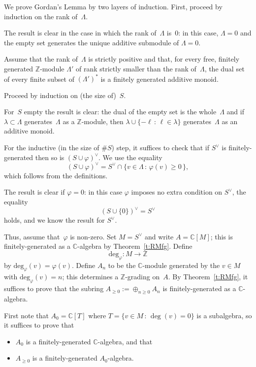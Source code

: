 \documentclass[english]{amsart}
\newcommand{\C}{\mathbb{C}}
\newcommand{\Z}{\mathbb{Z}}
\newcommand{\Az}{A_{\geq0}}
\newcommand{\ev}{\textrm{deg}_\varphi}
\begin{document}
We prove Gordan's Lemma by two layers of induction.  First, proceed by induction on the rank of~$\Lambda$.

The result is clear in the case in which the rank of~$\Lambda$ is~$0$: in this case, $\Lambda = 0$ and the empty set generates the unique additive submodule of $\Lambda = 0$.

Assume that the rank of~$\Lambda$ is strictly positive and that, for every free, finitely generated $\Z$-module $\Lambda'$ of rank strictly smaller than the rank of~$\Lambda$, the dual set of every finite subset of $\left(\Lambda'\right)^*$ is a finitely generated additive monoid.

Proceed by induction on (the size of)~$S$.

For~$S$ empty the result is clear: the dual of the empty set is the whole~$\Lambda$ and if $\lambda \subset \Lambda$ generates~$\Lambda$ as a $\Z$-module, then $\lambda \cup \{ -\ell \, : \, \ell \in \lambda \}$ generates~$\Lambda$ as an additive monoid.

For the inductive (in the size of $\#S$) step, it suffices to check that if $S^\vee$ is finitely-generated then so is $(S\cup{\varphi})^\vee$.  We use the equality
\[
(S\cup{\varphi})^\vee = S^\vee \cap \{v \in \Lambda \,:\, \varphi(v)\geq0\,\},
\]
which follows from the definitions.

The result is clear if $\varphi = 0$: in this case $\varphi$ imposes no extra condition on $S^\vee$, the equality
\[
(S \cup \{0\})^\vee = S^\vee
\]
holds, and we know the result for $S^\vee$.

Thus, assume that~$\varphi$ is non-zero.  Set $M=S^\vee$ and write $A=\C[M]$; this is finitely-generated as a $\mathbb{C}$-algebra by Theorem~\ref{t:RMfg}. Define
\[
\ev \colon M\to\Z
\]
by $\ev (v)=\varphi(v)$. Define $A_n$ to be the $\C$-module generated by the $v \in M$ with $\ev(v)=n$; this determines a $\Z$-grading on~$A$. By Theorem~\ref{t:RMfg}, it suffices to prove that the subring $A_{\geq0}:=\oplus_{n\geq0}A_n$ is finitely-generated as a $\mathbb{C}$-algebra.

First note that $A_0=\C[T]$ where $T=\{v \in M \,:\, \deg(v)=0\}$ is a subalgebra, so it suffices to prove that
\begin{itemize}
\item
$A_0$ is a finitely-generated $\C$-algebra, and that
\item
$\Az$ is a finitely-generated $A_0$-algebra.
\end{itemize}
\end{document}
